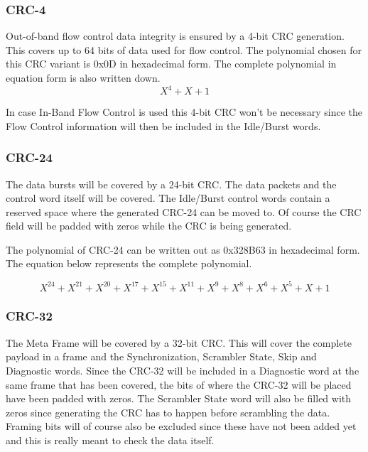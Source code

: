 	\subsubsection{CRC-4}
	\label{subsubsec:interlaken_CRC-4}
	Out-of-band flow control data integrity is ensured by a 4-bit CRC generation. This covers up to 64 bits of data used for flow control. The polynomial chosen for this CRC variant is 0x0D in hexadecimal form. The complete polynomial in equation form is also written down.
	\begin{equation*}
		X^{4}+X+1
	\end{equation*}
	
	In case In-Band Flow Control is used this 4-bit CRC won't be necessary since the Flow Control information will then be included in the Idle/Burst words.
	
	\subsubsection{CRC-24}
	\label{subsubsec:interlaken_CRC-24}
	The data bursts will be covered by a 24-bit CRC. The data packets and the control word itself will be covered. The Idle/Burst control words contain a reserved space where the generated CRC-24 can be moved to. Of course the CRC field will be padded with zeros while the CRC is being generated.
	
	The polynomial of CRC-24 can be written out as 0x328B63 in hexadecimal form. The equation below represents the complete polynomial.
	
	\begin{equation*}
		X^{24}+X^{21}+X^{20}+X^{17}+X^{15}+X^{11}+X^{9}+X^{8}+X^{6}+X^{5}+X+1
	\end{equation*}
	
	\subsubsection{CRC-32}
	\label{subsubsec:interlaken_CRC-32}
	The Meta Frame will be covered by a 32-bit CRC. This will cover the complete payload in a frame and the Synchronization, Scrambler State, Skip and Diagnostic words. Since the CRC-32 will be included in a Diagnostic word at the same frame that has been covered, the bits of where the CRC-32 will be placed have been padded with zeros.
	The Scrambler State word will also be filled with zeros since generating the CRC has to happen before scrambling the data. Framing bits will of course also be excluded since these have not been added yet and this is really meant to check the data itself.
	
